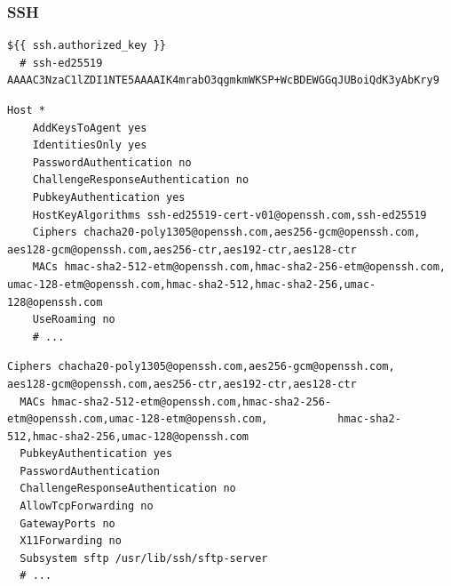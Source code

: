 \subsubsection{SSH}
\label{subsubsec:implementation_installer_configuration_files_ssh}

\begin{lstlisting}[language=shell, xleftmargin=\parindent, label={lst:ssh_authorized_keys}, caption=TODO]
  ${{ ssh.authorized_key }}
  # ssh-ed25519 AAAAC3NzaC1lZDI1NTE5AAAAIK4mrabO3qgmkmWKSP+WcBDEWGGqJUBoiQdK3yAbKry9
\end{lstlisting}

\begin{lstlisting}[language=shell, alsoletter={*.-@}, morekeywords={[4]{Host, AddKeysToAgent, IdentitiesOnly, PasswordAuthentication, ChallengeResponseAuthentication, PubkeyAuthentication, HostKeyAlgorithms, Ciphers, MACs, UseRoaming}}, keywordstyle={[5]\color{shellGreen}}, morekeywords={[5]{*, yes, no, ssh-ed25519-cert-v01@openssh.com, ssh-ed25519, chacha20-poly1305@openssh.com, aes256-gcm@openssh.com, aes128-gcm@openssh.com, aes256-ctr, aes192-ctr, aes128-ctr, hmac-sha2-512-etm@openssh.com, hmac-sha2-256-etm@openssh.com, umac-128-etm@openssh.com, hmac-sha2-512, hmac-sha2-256, umac-128@openssh.com}}, xleftmargin=\parindent, label={lst:ssh_config}, caption=TODO]
  Host *
    AddKeysToAgent yes
    IdentitiesOnly yes
    PasswordAuthentication no
    ChallengeResponseAuthentication no
    PubkeyAuthentication yes
    HostKeyAlgorithms ssh-ed25519-cert-v01@openssh.com,ssh-ed25519
    Ciphers chacha20-poly1305@openssh.com,aes256-gcm@openssh.com,                                           aes128-gcm@openssh.com,aes256-ctr,aes192-ctr,aes128-ctr
    MACs hmac-sha2-512-etm@openssh.com,hmac-sha2-256-etm@openssh.com,                                    umac-128-etm@openssh.com,hmac-sha2-512,hmac-sha2-256,umac-128@openssh.com
    UseRoaming no
    # ...
\end{lstlisting}

\begin{lstlisting}[language=shell, xleftmargin=\parindent, alsoletter={*.-@/}, morekeywords={[4]{Ciphers, MACs, PubkeyAuthentication, PasswordAuthentication, ChallengeResponseAuthentication, AllowTcpForwarding, GatewayPorts, X11Forwarding, Subsystem}}, keywordstyle={[5]\color{shellGreen}}, morekeywords={[5]{no, yes, sftp, /usr/lib/ssh/sftp-server, chacha20-poly1305@openssh.com, aes256-gcm@openssh.com, aes128-gcm@openssh.com, aes256-ctr, aes192-ctr, aes128-ctr, hmac-sha2-512-etm@openssh.com, hmac-sha2-256-etm@openssh.com, umac-128-etm@openssh.com, hmac-sha2-512, hmac-sha2-256, umac-128@openssh.com}}, label={lst:sshd_config}, caption=TODO]
  Ciphers chacha20-poly1305@openssh.com,aes256-gcm@openssh.com,                                           aes128-gcm@openssh.com,aes256-ctr,aes192-ctr,aes128-ctr
  MACs hmac-sha2-512-etm@openssh.com,hmac-sha2-256-etm@openssh.com,umac-128-etm@openssh.com,           hmac-sha2-512,hmac-sha2-256,umac-128@openssh.com
  PubkeyAuthentication yes
  PasswordAuthentication
  ChallengeResponseAuthentication no
  AllowTcpForwarding no
  GatewayPorts no
  X11Forwarding no
  Subsystem sftp /usr/lib/ssh/sftp-server
  # ...
\end{lstlisting}

